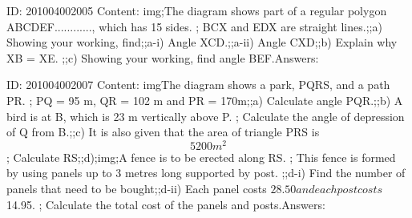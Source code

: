 \documentclass{article}
\begin{document}
ID: 201004002005
Content:
img;The diagram shows part of a regular polygon ABCDEF............, which has 15 sides. ; BCX and EDX are straight lines.;;a) Showing your working, find;;a-i) Angle XCD.;;a-ii) Angle CXD;;b) Explain why XB = XE. ;;c) Showing your working, find angle BEF.Answers:

ID: 201004002007
Content:
imgThe diagram shows a park, PQRS, and a path PR. ; PQ = 95 m, QR = 102 m and PR = 170m;;a) Calculate angle PQR.;;b) A bird is at B, which is 23 m vertically above P. ; Calculate the angle of depression of Q from B.;;c) It is also given that the area of triangle PRS is $$5200 m^2$$; Calculate RS;;d);img;A fence is to be erected along RS. ; This fence is formed by using panels up to 3 metres long supported by post. ;;d-i) Find the number of panels that need to be bought;;d-ii) Each panel costs $28.50 and each post costs $14.95. ; Calculate the total cost of the panels and posts.Answers:
\end{document}
